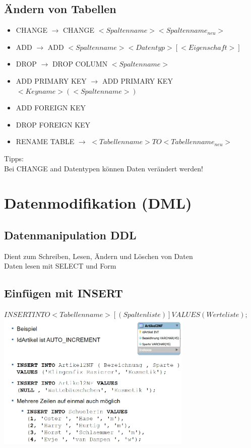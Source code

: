 \documentclass{scrreprt}
\begin{document}
\subsection{Ändern von Tabellen}
\begin{itemize}
  \item CHANGE $\rightarrow$ CHANGE $<Spaltenname> <Spaltenname_{neu}>$
  \item ADD $\rightarrow$ ADD $<Spaltenname> <Datentyp> [<Eigenschaft>]$
  \item DROP $\rightarrow$ DROP COLUMN $<Spaltenname>$
  \item ADD PRIMARY KEY $\rightarrow$ ADD PRIMARY KEY $<Keyname> (<Spaltenname>)$
  \item ADD FOREIGN KEY
  \item DROP FOREIGN KEY
  \item RENAME TABLE $\rightarrow$ $<Tabellenname> TO <Tabellenname_{neu}>$
\end{itemize}
Tipps:
\\Bei CHANGE and Datentypen können Daten verändert werden!
\section{Datenmodifikation (DML)}
\subsection{Datenmanipulation DDL}
Dient zum Schreiben, Lesen, Ändern und Löschen von Daten
\\Daten lesen mit SELECT und Form
\subsection{Einfügen mit INSERT}
$INSERT INTO <Tabellenname> [(Spaltenliste)]VALUES (Werteliste);$
\\\includegraphics[width=0.7\textwidth]{"graphics/Insert-Bsp"}
\end{document}
